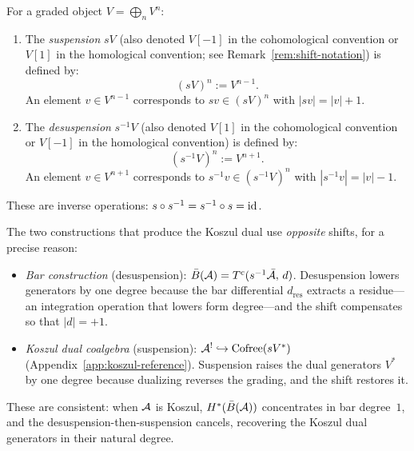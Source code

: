\begin{definition}
\label{def:suspension}
For a graded object $V = \bigoplus_n V^n$:
\begin{enumerate}[label=(\roman*)]
\item The \emph{suspension} $sV$ (also denoted $V[-1]$ in the cohomological convention or $V[1]$ in the homological convention; see Remark~\ref{rem:shift-notation}) is
defined by:
\[
(sV)^n := V^{n-1}.
\]
An element $v \in V^{n-1}$ corresponds to $sv \in (sV)^n$ with $|sv| = |v| + 1$.

\item The \emph{desuspension} $s^{-1}V$ (also denoted $V[1]$ in the cohomological convention or $V[-1]$ in the homological convention) is defined by:
\[
(s^{-1}V)^n := V^{n+1}.
\]
An element $v \in V^{n+1}$ corresponds to $s^{-1}v \in (s^{-1}V)^n$ with 
$|s^{-1}v| = |v| - 1$.
\end{enumerate}
These are inverse operations: $s \circ s^{-1} = s^{-1} \circ s = \mathrm{id}$.

The two constructions that produce the Koszul dual use \emph{opposite} shifts, for a precise reason:
\begin{itemize}
\item \emph{Bar construction} (desuspension): $\bar{B}(\mathcal{A}) = T^c(s^{-1}\bar{\mathcal{A}},\, d)$.  Desuspension lowers generators by one degree because the bar differential $d_{\mathrm{res}}$ extracts a residue---an integration operation that lowers form degree---and the shift compensates so that $|d| = +1$.
\item \emph{Koszul dual coalgebra} (suspension): $\mathcal{A}^! \hookrightarrow \mathrm{Cofree}(sV^*)$ (Appendix~\ref{app:koszul-reference}).  Suspension raises the dual generators $V^*$ by one degree because dualizing reverses the grading, and the shift restores it.
\end{itemize}
These are consistent: when $\mathcal{A}$ is Koszul, $H^*(\bar{B}(\mathcal{A}))$ concentrates in bar degree~$1$, and the desuspension-then-suspension cancels, recovering the Koszul dual generators in their natural degree.
\end{definition}

